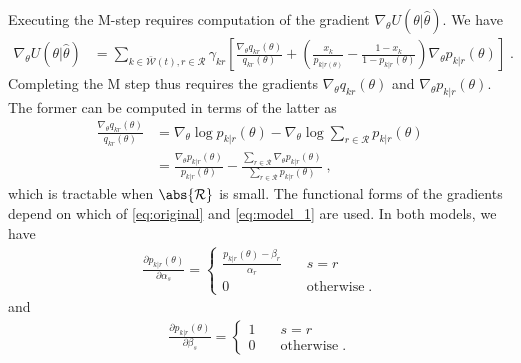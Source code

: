 \documentclass[english]{scrartcl}
\begin{document}
	Executing the M-step requires computation of the gradient $\nabla_\theta U(\theta|\hat{\theta})$. 
	We have 
	\begin{align}
		\nabla_\theta U(\theta|\hat{\theta}) &= \sum_{k \in \bar{\mathcal{W}}(t), r \in \mathcal{R}} \gamma_{kr} \left[ \frac{\nabla_\theta q_{kr}(\theta)}{q_{kr}(\theta)}  + \left(\frac{x_k}{p_{k|r(\theta)}} -  \frac{1-x_k}{1 - p_{k|r}(\theta)}\right) \nabla_\theta p_{k|r}(\theta)  \right]\;.
	\end{align}
	Completing the M step thus requires the gradients $\nabla_\theta q_{kr}(\theta)$ and $\nabla_\theta p_{k|r}(\theta)$. 
	The former can be computed in terms of the latter as 
	\begin{align}
		\frac{\nabla_\theta q_{kr}(\theta)}{q_{kr}(\theta)} &= \nabla_\theta\log p_{k|r}(\theta) - \nabla_\theta \log \sum_{r \in \mathcal{R}} p_{k|r}(\theta) \\ 
		&= \frac{\nabla_\theta p_{k|r}(\theta)}{p_{k|r}(\theta)} - \frac{\sum_{r \in \mathcal{R}} \nabla_\theta p_{k|r}(\theta)}{\sum_{r \in \mathcal{R}} p_{k|r}(\theta)}\;,
	\end{align}
	which is tractable when $\abs{\mathcal{R}}$ is small. 
	The functional forms of the gradients depend on which of \eqref{eq:original} and \eqref{eq:model_1} are used. 
	In both models, we have 
	\begin{align}
		\frac{\partial p_{k|r}(\theta)}{\partial \alpha_s} = \begin{cases} \frac{p_{k|r}(\theta) - \beta_r}{\alpha_r} &\quad s = r \\ 0 &\quad \text{otherwise}\;. \end{cases}
	\end{align}
	and 
	\begin{align}
		\frac{\partial p_{k|r}(\theta)}{\partial \beta_s} = \begin{cases} 1 &\quad s = r \\ 0 &\quad \text{otherwise}\;. \end{cases}
	\end{align}
\end{document}
